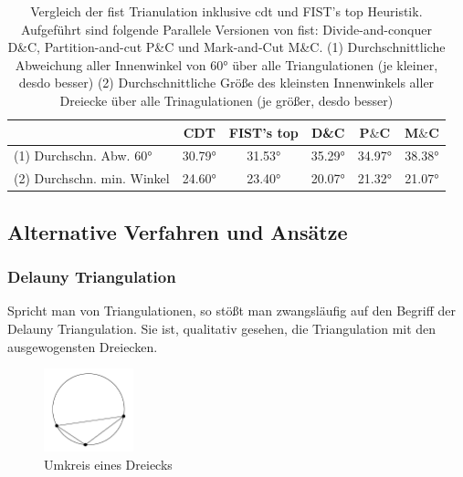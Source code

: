 \begin{table}[h]
    \begin{tabular}[h]{| l | c | c | c | c | c |}
    \hline
    & CDT & FIST's top & D\&C & P$\&$C & M$\&$C \\ \hline
    (1) Durchschn. Abw. 60° & 30.79° & 31.53° & 35.29° & 34.97° & 38.38° \\ \hline
    (2) Durchschn. min. Winkel & 24.60° & 23.40° & 20.07° & 21.32° & 21.07° \\ \hline
    \end{tabular}
    \caption[Vergleich verschiedener Parallelisierungen des \ac{eca} in \ac{fist}]{Vergleich der \ac{fist} Trianulation inklusive \ac{cdt} und FIST's top Heuristik. Aufgeführt sind folgende Parallele Versionen von \ac{fist}: 
    Divide-and-conquer D\&C, Partition-and-cut P\&C und Mark-and-Cut M\&C. 
    (1) Durchschnittliche Abweichung aller Innenwinkel von 60° über alle Triangulationen (je kleiner, desdo besser) 
    (2) Durchschnittliche Größe des kleinsten Innenwinkels aller Dreiecke über alle Trinagulationen (je größer, desdo besser) \cite{paralleleca}}
    \label{tab:tab1}
\end{table}

\subsection{Alternative Verfahren und Ansätze} 

\subsubsection{Delauny Triangulation}

Spricht man von Triangulationen, so stößt man zwangsläufig auf den Begriff der Delauny Triangulation. Sie ist, qualitativ gesehen, die Triangulation mit den ausgewogensten Dreiecken.

\begin{figure}
    \centering
    \includegraphics[width=0.23\textwidth]{bilder/umkreis.png}
    \caption[Umkreis eines Dreiecks]{\centering Umkreis eines Dreiecks \cite{delauny}}
    \label{fig:umkreis}
  \end{figure}

